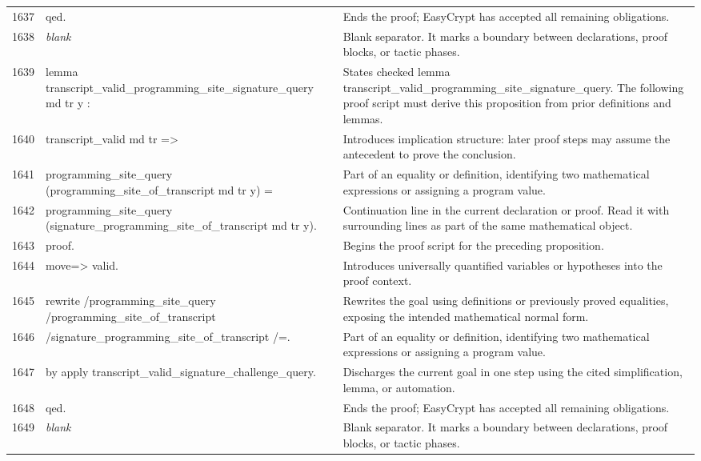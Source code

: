 \documentclass[10pt]{article}
\begin{document}
\begin{longtable}{r L{0.53\textwidth} L{0.37\textwidth}}
1637 & {\ttfamily\scriptsize qed.} & Ends the proof; EasyCrypt has accepted all remaining obligations. \\
1638 & {\ttfamily\scriptsize \emph{blank}} & Blank separator.  It marks a boundary between declarations, proof blocks, or tactic phases. \\
1639 & {\ttfamily\scriptsize lemma transcript\_valid\_programming\_site\_signature\_query md tr y :} & States checked lemma transcript\_valid\_programming\_site\_signature\_query.  The following proof script must derive this proposition from prior definitions and lemmas. \\
1640 & {\ttfamily\scriptsize   transcript\_valid md tr =>} & Introduces implication structure: later proof steps may assume the antecedent to prove the conclusion. \\
1641 & {\ttfamily\scriptsize   programming\_site\_query (programming\_site\_of\_transcript md tr y) =} & Part of an equality or definition, identifying two mathematical expressions or assigning a program value. \\
1642 & {\ttfamily\scriptsize   programming\_site\_query (signature\_programming\_site\_of\_transcript md tr y).} & Continuation line in the current declaration or proof.  Read it with surrounding lines as part of the same mathematical object. \\
1643 & {\ttfamily\scriptsize proof.} & Begins the proof script for the preceding proposition. \\
1644 & {\ttfamily\scriptsize move=> valid.} & Introduces universally quantified variables or hypotheses into the proof context. \\
1645 & {\ttfamily\scriptsize rewrite /programming\_site\_query /programming\_site\_of\_transcript} & Rewrites the goal using definitions or previously proved equalities, exposing the intended mathematical normal form. \\
1646 & {\ttfamily\scriptsize         /signature\_programming\_site\_of\_transcript /=.} & Part of an equality or definition, identifying two mathematical expressions or assigning a program value. \\
1647 & {\ttfamily\scriptsize by apply transcript\_valid\_signature\_challenge\_query.} & Discharges the current goal in one step using the cited simplification, lemma, or automation. \\
1648 & {\ttfamily\scriptsize qed.} & Ends the proof; EasyCrypt has accepted all remaining obligations. \\
1649 & {\ttfamily\scriptsize \emph{blank}} & Blank separator.  It marks a boundary between declarations, proof blocks, or tactic phases. \\

\end{longtable}
\end{document}
